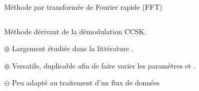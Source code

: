 \documentclass[../main.tex]{subfiles}
\begin{document}
\begin{frame}{Méthode par transformée de Fourier rapide (FFT)}{}
  \begin{columns}
    \begin{column}{.8\linewidth}
      Méthode dérivant de la démodulation CCSK.
      \begin{ctrlitemize}{0pt}
        \item [\textcolor{Chartreuse4}{$\bm{\oplus}$}] Largement étudiée dans la littérature \cite{abassiNonbinaryLowdensityParitycheck2013,kastnerParallelProgrammingFPGAs2018}.
        \item [\textcolor{Chartreuse4}{$\bm{\oplus}$}] Versatile, duplicable afin de faire varier les paramètres \textcolor{red}{\pd{}} et \textcolor{blue}{\po{}}.
        \item [\textcolor{Red3}{$\bm{\ominus}$}] Peu adapté au traitement d'un flux de données
      \end{ctrlitemize}
    \end{column}
  \end{columns}
\end{frame}
\end{document}
